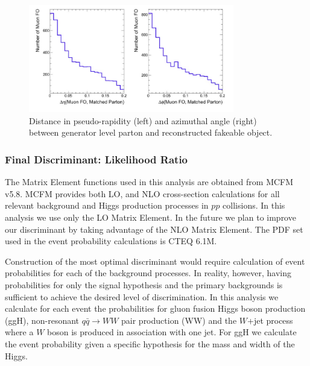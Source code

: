 \documentclass{cmspaper}
\begin{document}
\begin{figure}[!htbp]                                                                                         
\begin{center}                                                                                                
\includegraphics[width=0.8\textwidth]{figures/PartonLeptonDIrection.png}                                            
\caption{Distance in pseudo-rapidity (left) and azimuthal angle (right)
between generator level parton and reconstructed fakeable object.}                                                                                 
\label{fig:partonleptondirection}                                                                                          
\end{center}                                                                                                  
\end{figure}   


\clearpage
\subsubsection{Final Discriminant: Likelihood Ratio}
\label{sec:LR}
The Matrix Element functions used in this analysis are obtained from MCFM v5.8.  
MCFM provides both LO, and NLO cross-section calculations for 
all relevant background and Higgs production processes in $pp$ collisions. In this analysis 
we use only the LO Matrix Element. In the future we plan to improve our discriminant 
by taking advantage of the NLO Matrix Element. The PDF set used in the event probability 
calculations is CTEQ 6.1M.

Construction of the most optimal discriminant would require calculation 
of event probabilities for each of the background processes. In reality, however, having 
probabilities for only the signal hypothesis and the primary backgrounds is sufficient to achieve 
the desired level of discrimination. In this analysis we calculate for each event the probabilities 
for gluon fusion Higgs boson production (ggH), non-resonant $q\bar{q}\rightarrow WW$ pair 
production (WW) and the $W$+jet process where a $W$ boson is produced in association
with one jet.   For ggH we calculate the event probability given a specific hypothesis for the
mass and width of the Higgs.
\end{document}
